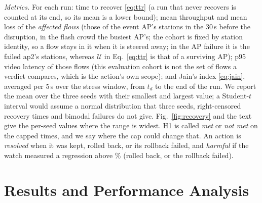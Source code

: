 \documentclass[conference]{IEEEtran}
\begin{document}
\emph{Metrics.} For each run: time to recover \eqref{eq:ttr} (a run that never recovers is counted at its end, so its mean is a lower bound); mean throughput and mean loss of the \emph{affected flows} (those of the event AP's stations in the 30\,s before the disruption, in the flash crowd the busiest AP's; the cohort is fixed by station identity, so a flow stays in it when it is steered away; in the AP failure it is the failed ap2's stations, whereas $\mathcal U$ in Eq.~\eqref{eq:ttr} is that of a surviving AP); p95 video latency of those flows (this evaluation cohort is not the set of flows a verdict compares, which is the action's own scope); and Jain's index \eqref{eq:jain}, averaged per 5\,s over the stress window, from $t_d$ to the end of the run. We report the mean over the three seeds with their smallest and largest value; a Student-$t$ interval would assume a normal distribution that three seeds, right-censored recovery times and bimodal failures do not give. Fig.~\ref{fig:recovery} and the text give the per-seed values where the range is widest. H1 is called \emph{met} or \emph{not met} on the capped times, and we say where the cap could change that. An action is \emph{resolved} when it was kept, rolled back, or its rollback failed, and \emph{harmful} if the watch measured a regression above \CfgRegressPct\% (rolled back, or the rollback failed).

\section{Results and Performance Analysis}
\begin{table}[t]
\caption{KPIs of the affected flows (mean and [smallest--largest] over the three seeds; with so few seeds no interval is given). $\geq$ marks a recovery time that includes runs that never recovered (their number in brackets), counted at the run end. A p95 latency of 1000\,ms is the probe's value for a ping that gets no reply.}
\label{tab:kpi}
\centering\small\setlength{\tabcolsep}{4pt}%

\end{table}
\end{document}

